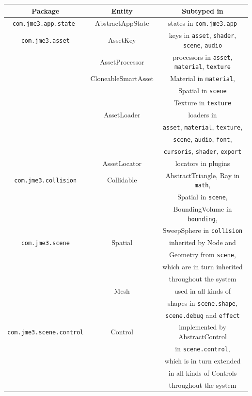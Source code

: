 \documentclass[a4paper, 10pt]{article}
\begin{document}
\begin{tabular}{|c|c|c|}
\hline
\textbf{Package}&\textbf{Entity}&\textbf{Subtyped in}\\
\hline
\verb|com.jme3.app.state |&
	AbstractAppState&
		states in \verb|com.jme3.app|\\

\hline
\verb|com.jme3.asset|&
	AssetKey&
	keys in \verb|asset|, \verb|shader|, \verb|scene|, \verb|audio|\\
\hline&
	AssetProcessor&
	processors in \verb|asset|, \verb|material|, \verb|texture|\\
\hline&
	CloneableSmartAsset&
	Material in \verb|material|,\\&& 
	Spatial in \verb|scene|\\&&
	Texture in \verb|texture|\\
\hline&
	AssetLoader&
	loaders in\\&&
	\verb|asset|, \verb|material|, \verb|texture|,\\&&
	\verb|scene|, \verb|audio|, \verb|font|, \\&&
	\verb|cursoris|, \verb|shader|, \verb|export|\\
\hline&
	AssetLocator&
	locators in plugins\\
\hline
\verb|com.jme3.collision|&
	Collidable&
	AbstractTriangle, Ray in \verb|math|,\\&&
	Spatial in \verb|scene|,\\&&
	BoundingVolume in \verb|bounding|,\\&&
	SweepSphere in \verb|collision|\\

\hline
\verb|com.jme3.scene|&
	Spatial&
	inherited by Node and\\&&
	Geometry from \verb|scene|,\\&&
	which are in turn inherited\\&&
	throughout the system\\
\hline&
	Mesh&
	used in all kinds of \\&&
	shapes in \verb|scene.shape|,\\&&
	\verb|scene.debug| and \verb|effect|\\
\hline
\verb|com.jme3.scene.control|&
	Control&
	implemented by AbstractControl \\&&
	in \verb|scene.control|,\\&&
	which is in turn extended \\&&
	in all kinds of Controls\\&&
	throughout the system\\
\hline
\end{tabular}
\end{document}
